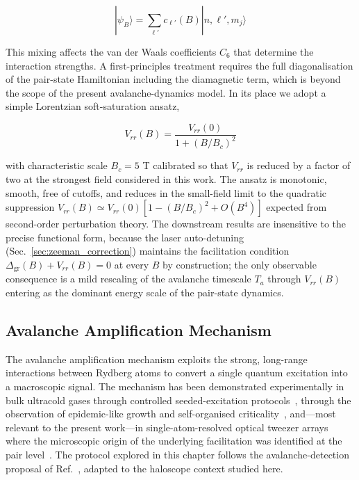 \begin{equation}
    |\psi_B\rangle = \sum_{\ell'} c_{\ell'}(B) |n,\ell',m_j\rangle
    \label{eq:state_mixing}
\end{equation}

This mixing affects the van der Waals coefficients $C_6$ that determine the interaction strengths. A first-principles treatment requires the full diagonalisation of the pair-state Hamiltonian including the diamagnetic term, which is beyond the scope of the present avalanche-dynamics model. In its place we adopt a simple Lorentzian soft-saturation ansatz,

\begin{equation}
    V_{rr}(B) = \frac{V_{rr}(0)}{1 + (B/B_c)^2}
    \label{eq:interaction_suppression}
\end{equation}

with characteristic scale $B_c = 5$ T calibrated so that $V_{rr}$ is reduced by a factor of two at the strongest field considered in this work. The ansatz is monotonic, smooth, free of cutoffs, and reduces in the small-field limit to the quadratic suppression $V_{rr}(B) \simeq V_{rr}(0)\left[1 - (B/B_c)^2 + O(B^4)\right]$ expected from second-order perturbation theory. The downstream results are insensitive to the precise functional form, because the laser auto-detuning (Sec.~\ref{sec:zeeman_correction}) maintains the facilitation condition $\Delta_{\mathrm{gr}}(B) + V_{rr}(B) = 0$ at every $B$ by construction; the only observable consequence is a mild rescaling of the avalanche timescale $T_a$ through $V_{rr}(B)$ entering as the dominant energy scale of the pair-state dynamics.

\subsection*{Avalanche Amplification Mechanism}

The avalanche amplification mechanism exploits the strong, long-range interactions between Rydberg atoms to convert a single quantum excitation into a macroscopic signal. The mechanism has been demonstrated experimentally in bulk ultracold gases through controlled seeded-excitation protocols~\cite{Simonelli2016}, through the observation of epidemic-like growth and self-organised criticality~\cite{Helmrich2020,Wintermantel2021}, and---most relevant to the present work---in single-atom-resolved optical tweezer arrays where the microscopic origin of the underlying facilitation was identified at the pair level~\cite{Festa2022}. The protocol explored in this chapter follows the avalanche-detection proposal of Ref.~\cite{Nill2024}, adapted to the haloscope context studied here.


